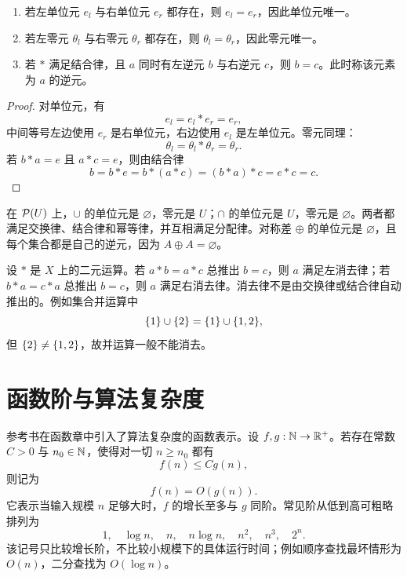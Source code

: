 \begin{theorem}\label{identity-inverse-unique}
  \begin{enumerate}
    \item 若左单位元 $e_l$ 与右单位元 $e_r$ 都存在，则 $e_l=e_r$，因此单位元唯一。
    \item 若左零元 $\theta_l$ 与右零元 $\theta_r$ 都存在，则 $\theta_l=\theta_r$，因此零元唯一。
    \item 若 $*$ 满足结合律，且 $a$ 同时有左逆元 $b$ 与右逆元 $c$，则 $b=c$。此时称该元素为 $a$ 的逆元。
  \end{enumerate}
\end{theorem}

\begin{proof}
  对单位元，有
  \[
  e_l=e_l*e_r=e_r,
  \]
  中间等号左边使用 $e_r$ 是右单位元，右边使用 $e_l$ 是左单位元。零元同理：
  \[
  \theta_l=\theta_l*\theta_r=\theta_r.
  \]
  若 $b*a=e$ 且 $a*c=e$，则由结合律
  \[
  b=b*e=b*(a*c)=(b*a)*c=e*c=c.
  \]
\end{proof}

\begin{example}[title={集合运算中的特殊元素}]\label{set-operation-elements}
  在 $\mathcal P(U)$ 上，$\cup$ 的单位元是 $\varnothing$，零元是 $U$；$\cap$ 的单位元是 $U$，零元是 $\varnothing$。两者都满足交换律、结合律和幂等律，并互相满足分配律。对称差 $\oplus$ 的单位元是 $\varnothing$，且每个集合都是自己的逆元，因为 $A\oplus A=\varnothing$。
\end{example}

设 $*$ 是 $X$ 上的二元运算。若 $a*b=a*c$ 总推出 $b=c$，则 $a$ 满足左消去律；若 $b*a=c*a$ 总推出 $b=c$，则 $a$ 满足右消去律。消去律不是由交换律或结合律自动推出的。例如集合并运算中
\[
\{1\}\cup\{2\}=\{1\}\cup\{1,2\},
\]
但 $\{2\}\ne\{1,2\}$，故并运算一般不能消去。

\section{函数阶与算法复杂度}

参考书在函数章中引入了算法复杂度的函数表示。设 $f,g:\mathbb{N}\to\mathbb{R}^+$。若存在常数 $C>0$ 与 $n_0\in\mathbb{N}$，使得对一切 $n\ge n_0$ 都有
\[
f(n)\le Cg(n),
\]
则记为
\[
f(n)=O(g(n)).
\]
它表示当输入规模 $n$ 足够大时，$f$ 的增长至多与 $g$ 同阶。常见阶从低到高可粗略排列为
\[
1,\quad \log n,\quad n,\quad n\log n,\quad n^2,\quad n^3,\quad 2^n.
\]
该记号只比较增长阶，不比较小规模下的具体运行时间；例如顺序查找最坏情形为 $O(n)$，二分查找为 $O(\log n)$。
